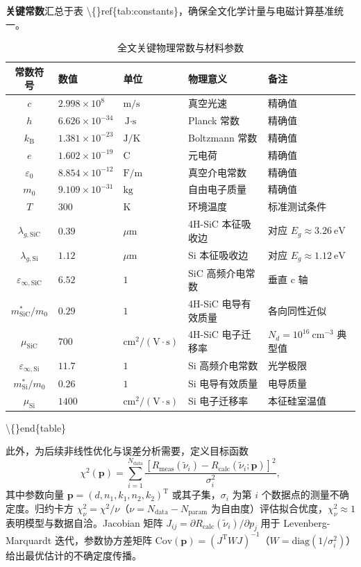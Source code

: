 \documentclass{mcmthesis}
\begin{document}
\textbf{关键常数}汇总于表 \textbackslash\{\}ref\{tab:constants\}，确保全文化学计量与电磁计算基准统一。

\begin{table}[htbp]
\centering
\caption{全文关键物理常数与材料参数}\label{tab:constants}
\begin{tabular}{@{}cllll@{}}
\toprule
常数符号 & 数值 & 单位 & 物理意义 & 备注 \\
\midrule
$c$ & $2.998 \times 10^8$ & $\text{m/s}$ & 真空光速 & 精确值 \\
$h$ & $6.626 \times 10^{-34}$ & $\text{J}\cdot\text{s}$ & Planck 常数 & 精确值 \\
$k_{\text{B}}$ & $1.381 \times 10^{-23}$ & $\text{J/K}$ & Boltzmann 常数 & 精确值 \\
$e$ & $1.602 \times 10^{-19}$ & $\text{C}$ & 元电荷 & 精确值 \\
$\varepsilon_0$ & $8.854 \times 10^{-12}$ & $\text{F/m}$ & 真空介电常数 & 精确值 \\
$m_0$ & $9.109 \times 10^{-31}$ & $\text{kg}$ & 自由电子质量 & 精确值 \\
$T$ & $300$ & $\text{K}$ & 环境温度 & 标准测试条件 \\
$\lambda_{g,\text{SiC}}$ & $0.39$ & $\mu\text{m}$ & 4H-SiC 本征吸收边 & 对应 $E_g \approx 3.26~\text{eV}$ \\
$\lambda_{g,\text{Si}}$ & $1.12$ & $\mu\text{m}$ & Si 本征吸收边 & 对应 $E_g \approx 1.12~\text{eV}$ \\
$\varepsilon_{\infty,\text{SiC}}$ & $6.52$ & $1$ & SiC 高频介电常数 & 垂直 c 轴 \\
$m^*_{\text{SiC}}/m_0$ & $0.29$ & $1$ & 4H-SiC 电导有效质量 & 各向同性近似 \\
$\mu_{\text{SiC}}$ & $700$ & $\text{cm}^2/(\text{V}\cdot\text{s})$ & 4H-SiC 电子迁移率 & $N_d = 10^{16}~\text{cm}^{-3}$ 典型值 \\
$\varepsilon_{\infty,\text{Si}}$ & $11.7$ & $1$ & Si 高频介电常数 & 光学极限 \\
$m^*_{\text{Si}}/m_0$ & $0.26$ & $1$ & Si 电导有效质量 & 电导质量 \\
$\mu_{\text{Si}}$ & $1400$ & $\text{cm}^2/(\text{V}\cdot\text{s})$ & Si 电子迁移率 & 本征硅室温值 \\
\bottomrule
\end{tabular}
\textbackslash\{\}end\{table\}

此外，为后续非线性优化与误差分析需要，定义目标函数
\begin{equation}\label{eq:objective}
\chi^2(\boldsymbol{p}) = \sum_{i=1}^{N_{\text{data}}} \frac{[R_{\text{meas}}(\tilde{\nu}_i) - R_{\text{calc}}(\tilde{\nu}_i; \boldsymbol{p})]^2}{\sigma_i^2},
\end{equation}
其中参数向量 $\boldsymbol{p} = (d, n_1, k_1, n_2, k_2)^{\text{T}}$ 或其子集，$\sigma_i$ 为第 $i$ 个数据点的测量不确定度。归约卡方 $\chi^2_{\nu} = \chi^2/\nu$（$\nu = N_{\text{data}} - N_{\text{param}}$ 为自由度）评估拟合优度，$\chi^2_{\nu} \approx 1$ 表明模型与数据自洽。Jacobian 矩阵 $J_{ij} = \partial R_{\text{calc}}(\tilde{\nu}_i)/\partial p_j$ 用于 Levenberg-Marquardt 迭代，参数协方差矩阵 $\text{Cov}(\boldsymbol{p}) = (J^{\text{T}}WJ)^{-1}$（$W = \text{diag}(1/\sigma_i^2)$）给出最优估计的不确定度传播。



\end{table}
\end{document}
